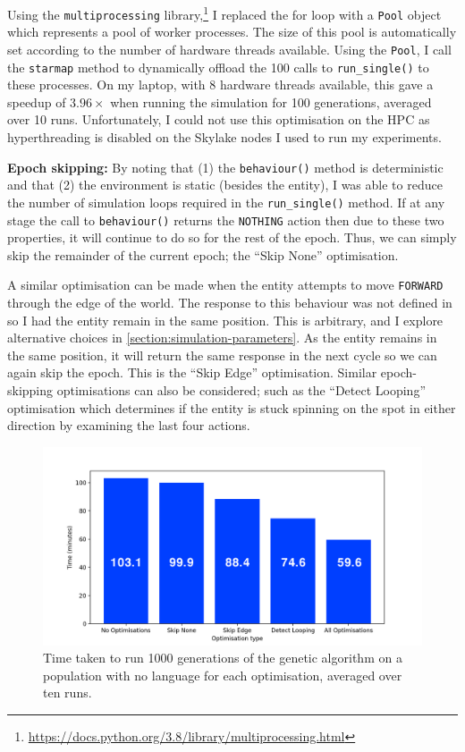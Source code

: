 \documentclass[12pt,a4paper]{report}
\begin{document}
Using the \texttt{multiprocessing} library,\footnote{\url{https://docs.python.org/3.8/library/multiprocessing.html}} I replaced the for loop with a \texttt{Pool} object which represents a pool of worker processes. The size of this pool is automatically set according to the number of hardware threads available. Using the \texttt{Pool}, I call the \texttt{starmap} method to dynamically offload the 100 calls to \texttt{run\_single()} to these processes. On my laptop, with 8 hardware threads available, this gave a speedup of $3.96\times$ when running the simulation for 100 generations, averaged over 10 runs. Unfortunately, I could not use this optimisation on the HPC as hyperthreading is disabled on the Skylake nodes I used to run my experiments.

{\bf Epoch skipping:} By noting that (1) the \texttt{behaviour()} method is deterministic and that (2) the environment is static (besides the entity), I was able to reduce the number of simulation loops required in the \texttt{run\_single()} method. If at any stage the call to \texttt{behaviour()} returns the \texttt{NOTHING} action then due to these two properties, it will continue to do so for the rest of the epoch. Thus, we can simply skip the remainder of the current epoch; the ``Skip None'' optimisation. 

A similar optimisation can be made when the entity attempts to move \texttt{FORWARD} through the edge of the world. The response to this behaviour was not defined in \citet{Cangelosi1998} so I had the entity remain in the same position. This is arbitrary, and I explore alternative choices in \cref{section:simulation-parameters}. As the entity remains in the same position, it will return the same response in the next cycle so we can again skip the epoch. This is the ``Skip Edge'' optimisation. Similar epoch-skipping optimisations can also be considered; such as the ``Detect Looping'' optimisation which determines if the entity is stuck spinning on the spot in either direction by examining the last four actions. 

\begin{figure}[t]
  \centering
  \captionsetup{width=.9\linewidth}
  \includegraphics[width=.9\linewidth]{figs/speedup2}
  \caption{Time taken to run 1000 generations of the genetic algorithm on a population with no language for each optimisation, averaged over ten runs.}
  \label{fig:speedup}
\end{figure}
\end{document}
